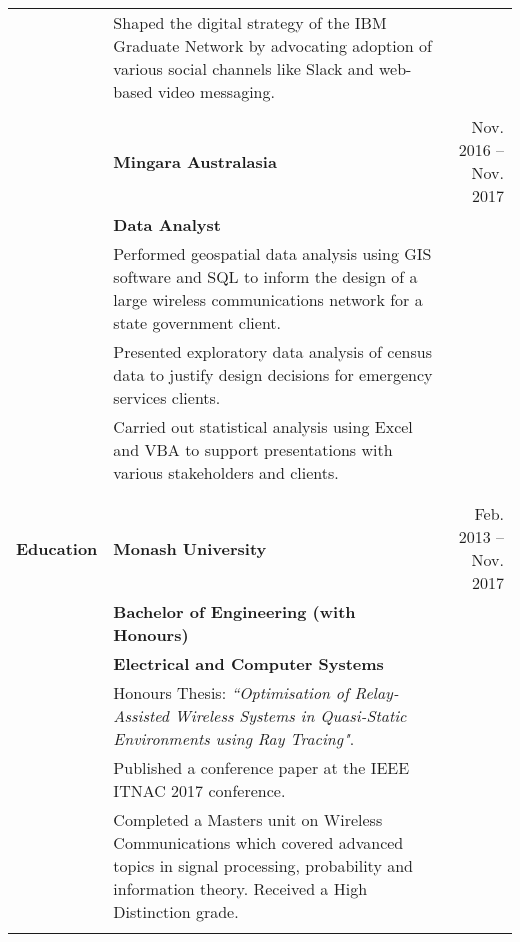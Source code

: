 \documentclass[a4paper,10pt]{letter}
\begin{document}
\begin{longtable}{ @{} p{2.5cm} p{12cm} r }
 & Shaped the digital strategy of the IBM Graduate Network by advocating adoption of various social channels like Slack and web-based video messaging. & \\
 & & \\
\large
 & \textbf{Mingara Australasia} & \normalsize Nov. 2016 -- Nov. 2017 \\
 & \textbf{Data Analyst} & \\
\large
 & Performed geospatial data analysis using GIS software and SQL to inform the design of a large wireless communications network for a state government client. & \\
 & Presented exploratory data analysis of census data to justify design decisions for emergency services clients. & \\
 & Carried out statistical analysis using Excel and VBA to support presentations with various stakeholders and clients. & \\
 & & \\
\newpage
\hline \\
\large
\textbf{Education} & \textbf{Monash University} & \normalsize Feb. 2013 -- Nov. 2017 \\
 & \textbf{Bachelor of Engineering (with Honours)} & \\
 & \textbf{Electrical and Computer Systems} & \\
\large
 & Honours Thesis: \textit{``Optimisation of Relay-Assisted Wireless Systems in Quasi-Static Environments using Ray Tracing"}. & \\
 & Published a conference paper at the IEEE ITNAC 2017 conference. & \\
 & Completed a Masters unit on Wireless Communications which covered advanced topics in signal processing, probability and information theory. Received a High Distinction grade. & \\
 & \\


\end{longtable}
\end{document}
